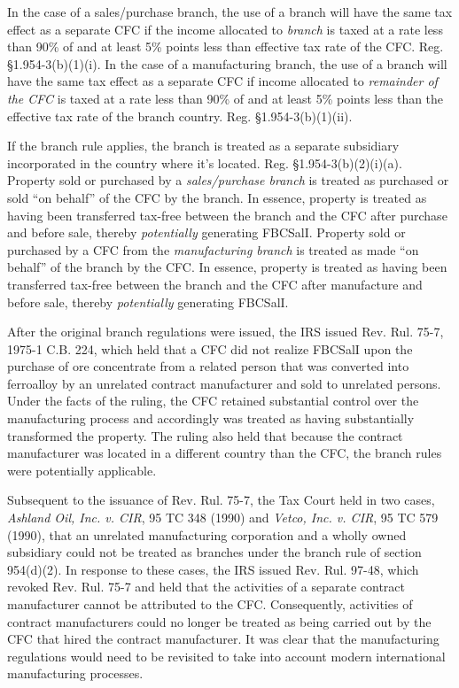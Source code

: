 	In the case of a sales/purchase branch, the use of a branch will have the same tax effect as a separate CFC if the income allocated to \emph{branch} is taxed at a rate less than 90\% of and at least 5\% points less than effective tax rate of the CFC.  Reg. \S 1.954-3(b)(1)(i).  In the case of a manufacturing branch, the use of a branch will have the same tax effect as a separate CFC if income allocated to \emph{remainder of the CFC} is taxed at a rate less than 90\% of and at least 5\% points less than the effective tax rate of the branch country.  Reg. \S 1.954-3(b)(1)(ii).
	
	If the branch rule applies, the branch is treated as a separate subsidiary incorporated in the country where it's located.  Reg. \S 1.954-3(b)(2)(i)(a).  Property sold or purchased by a \emph{sales/purchase branch} is treated as purchased or sold ``on behalf'' of the CFC by the branch.  In essence, property is treated as having been transferred tax-free between the branch and the CFC after purchase and before sale, thereby \emph{potentially} generating FBCSalI.  Property sold or purchased by a CFC from the \emph{manufacturing branch} is treated as made ``on behalf'' of the branch by the CFC.  In essence, property is treated as having been transferred tax-free between the branch and the CFC after manufacture and before sale, thereby \emph{potentially} generating FBCSalI.

	After the original branch regulations were issued, the IRS issued Rev. Rul. 75-7, 1975-1 C.B. 224, which held that a CFC did not realize FBCSalI upon the purchase of ore concentrate from a related person that was converted into ferroalloy by an unrelated contract manufacturer and sold to unrelated persons.  Under the facts of the ruling, the CFC retained substantial control over the manufacturing process and accordingly was treated as having substantially transformed the property.  The ruling also held that because the contract manufacturer was located in a different country than the CFC, the branch rules were potentially applicable.
	
	Subsequent to the issuance of Rev. Rul. 75-7, the Tax Court held in two cases, \emph{Ashland Oil, Inc. v. CIR}, 95 TC 348 (1990) and \emph{Vetco, Inc. v. CIR}, 95 TC 579 (1990), that an unrelated manufacturing corporation and a wholly owned subsidiary could not be treated as branches under the branch rule of section 954(d)(2).  In response to these cases, the IRS issued Rev. Rul. 97-48, which revoked Rev. Rul. 75-7 and held that the activities of a separate contract manufacturer cannot be attributed to the CFC.  Consequently, activities of contract manufacturers could no longer be treated as being carried out by the CFC that hired the contract manufacturer.  It was clear that the manufacturing regulations would need to be revisited to take into account modern international manufacturing processes. 
	
